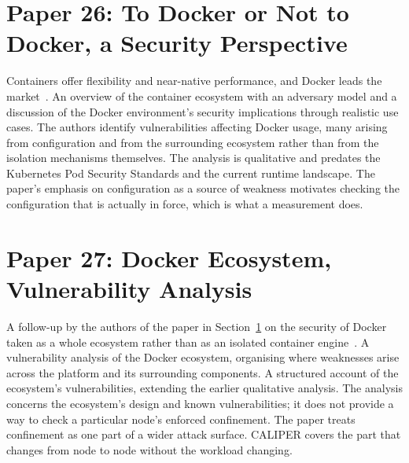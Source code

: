 \section{Paper 26: To Docker or Not to Docker, a Security Perspective}
\label{lit:combe}

 Containers offer flexibility and near-native performance, and Docker leads the market~\cite{combe2016}.
 An overview of the container ecosystem with an adversary model and a discussion of the Docker environment's security implications through realistic use cases.
 The authors identify vulnerabilities affecting Docker usage, many arising from configuration and from the surrounding ecosystem rather than from the isolation mechanisms themselves.
 The analysis is qualitative and predates the Kubernetes Pod Security Standards and the current runtime landscape.
 The paper's emphasis on configuration as a source of weakness motivates checking the configuration that is actually in force, which is what a measurement does.

\section{Paper 27: Docker Ecosystem, Vulnerability Analysis}
\label{lit:martin}

 A follow-up by the authors of the paper in Section~\ref{lit:combe} on the security of Docker taken as a whole ecosystem rather than as an isolated container engine~\cite{martin2018}.
 A vulnerability analysis of the Docker ecosystem, organising where weaknesses arise across the platform and its surrounding components.
 A structured account of the ecosystem's vulnerabilities, extending the earlier qualitative analysis.
 The analysis concerns the ecosystem's design and known vulnerabilities; it does not provide a way to check a particular node's enforced confinement.
 The paper treats confinement as one part of a wider attack surface. CALIPER covers the part that changes from node to node without the workload changing.

